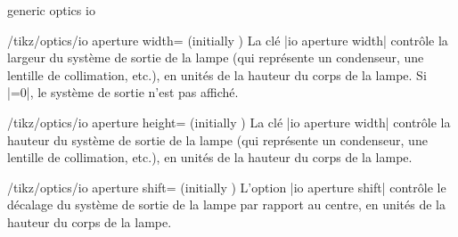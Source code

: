\documentclass[a4paper]{ltxdoc}
\begin{document}
\begin{shape}{generic optics io}
\begin{key}{/tikz/optics/io aperture width= (initially )}
    La clé |io aperture width| contrôle la largeur du système de sortie de la lampe (qui représente un condenseur, une lentille de collimation, etc.), en unités de la hauteur du corps de la lampe. Si |=0|, le système de sortie n'est pas affiché.

    \begin{codeexample}[]
    \end{codeexample}
\end{key}




\begin{key}{/tikz/optics/io aperture height= (initially )}
    La clé |io aperture width| contrôle la hauteur du système de sortie de la lampe (qui représente un condenseur, une lentille de collimation, etc.), en unités de la hauteur du corps de la lampe.

    \begin{codeexample}[]
    \end{codeexample}
\end{key}


\begin{key}{/tikz/optics/io aperture shift= (initially )}
    L'option |io aperture shift| contrôle le décalage du système de sortie de la lampe par rapport au centre, en unités de la hauteur du corps de la lampe.

    \begin{codeexample}[]
    \end{codeexample}
\end{key}



\end{shape}
\end{document}
